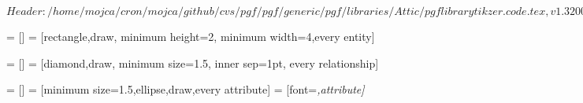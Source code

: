%
%
%

\ProvidesFileRCS[v\pgfversion] $Header: /home/mojca/cron/mojca/github/cvs/pgf/pgf/generic/pgf/libraries/Attic/pgflibrarytikzer.code.tex,v 1.3 2006/10/11 15:22:26 tantau Exp $



=           []
=                 [rectangle,draw,
                                     minimum height=2\baselineskip,
                                     minimum width=4\baselineskip,every entity]



=     []
=           [diamond,draw,
                                     minimum size=1.5\baselineskip,
                                     inner sep=1pt,
                                     every relationship]



=        []
=              [minimum size=1.5\baselineskip,ellipse,draw,every attribute]
=          [font=\itshape,attribute]




\endinput
